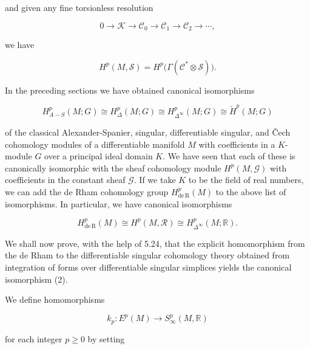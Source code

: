 and given any fine torsionless resolution

\begin{equation}
\tag{2}\label{eq:5.34:2}
0\to\mathcal{K}\to\mathcal{C}_{0}\to\mathcal{C}_{1}\to\mathcal{C}_{2}\to\cdots,
\end{equation}

we have

\begin{equation}
\tag{3}\label{eq:5.34:3}
H^{p}(M,\mathcal{S})=H^{p}\big(\Gamma(\mathcal{C}^{*}\otimes\mathcal{S})\big).
\end{equation}

\label{thm:5.35}In the preceding sections we have obtained canonical isomorphisms

\begin{equation}
\tag{1}\label{eq:5.35:1}
H_{A-S}^{p}(M;G)\cong H_{\Delta}^{p}(M;G)\cong H_{\Delta^{\infty}}^{p}(M;G)\cong\check{H}^{p}(M;G)
\end{equation}

of the classical Alexander-Spanier, singular, differentiable singular, and Čech cohomology modules of a differentiable manifold $M$ with coefficients in a $K$-module $G$ over a principal ideal domain $K$. We have seen that each of these is canonically isomorphic with the sheaf cohomology module $H^{p}(M,\mathcal{G})$ with coefficients in the constant sheaf $\mathcal{G}$. If we take $K$ to be the field of real numbers, we can add the de Rham cohomology group $H_{\mathrm{de\,R}}^{p}(M)$ to the above list of isomorphisms. In particular, we have canonical isomorphisms

\begin{equation}
\tag{2}\label{eq:5.35:2}
H_{\mathrm{de\,R}}^{p}(M)\cong H^{p}(M,\mathcal{R})\cong H_{\Delta^{\infty}}^{p}(M;\mathbb{R}).
\end{equation}

We shall now prove, with the help of 5.24, that the explicit homomorphism from the de Rham to the differentiable singular cohomology theory obtained from integration of forms over differentiable singular simplices yields the canonical isomorphism (2).

We define homomorphisms

\begin{equation}
\tag{3}\label{eq:5.35:3}
k_{p}\colon E^{p}(M)\to S_{\infty}^{p}(M,\mathbb{R})
\end{equation}

for each integer  $ p \geq 0 $ by setting

